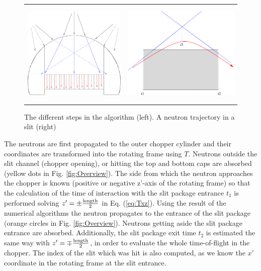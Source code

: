 \begin{figure}
\begin{center}
\begin{tabular}{cc}
\includegraphics[height=5cm]{./figures/FCAlgo}
&
\includegraphics[height=5cm]{./figures/FCtangents}
\end{tabular}
\end{center}
\caption{The different steps in the algorithm (left). A neutron trajectory in a slit (right)}
\label{fig:TOFalg}
\end{figure}

The neutrons are first propagated to the outer chopper cylinder and their coordinates are transformed into the rotating frame using $T$. Neutrons outside the slit channel (chopper opening), or hitting the top and bottom caps are absorbed (yellow dots in Fig. \ref{fig:Overview}). The side from which the neutron approaches the chopper is known (positive or negative z'-axis of the rotating frame) so that the calculation of the time of interaction with the slit package entrance $t_1$ is performed solving $z' = \pm \frac{\rm length}{2}$ in Eq. (\ref{eq:Txz}). Using the result of the numerical algorithms the neutron propagates to the entrance of the slit package (orange circles in Fig. \ref{fig:Overview}). Neutrons getting aside the slit package entrance are absorbed. Additionally, the slit package exit time $t_2$ is estimated the same way with $z' = \mp \frac{\rm length}{2}$, in order to evaluate the whole time-of-flight in the chopper. The index of the slit which was hit is also computed, as we know the $x'$ coordinate in the rotating frame at the slit entrance.

